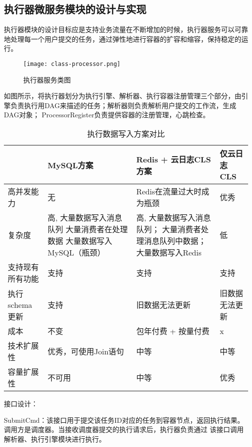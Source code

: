 \subsection{执行器微服务模块的设计与实现}

执行器模块的设计目标应是支持业务流量在不断增加的时候，执行器服务可以可靠地处理每一个用户提交的任务，通过弹性地进行容器的扩容和缩容，保持稳定的运行。

    \begin{figure}[H]
        \centering
        \texttt{[image: class-processor.png]}
        \caption{执行器服务类图}
        \label{fig:zxqfw}
    \end{figure}
    如图所示，将执行器划分为执行引擎、解析器、执行容器注册管理三个部分，由引擎负责执行用DAG来描述的任务；解析器则负责解析用户提交的工作流，生成DAG对象；
    ProcessorRegister负责提供容器的注册管理，心跳检查。


\begin{table}[H]
    \centering
    \caption{执行数据写入方案对比}
    \label{tab:design_1}
    \begin{tabular}{lp{8em}p{8em}l}
        \toprule
        & MySQL方案   & Redis + 云日志CLS方案          & 仅云日志CLS \\
        \midrule
        高并发能力 & 无 & Redis在流量过大时成为瓶颈 & 优秀\\
        复杂度 & 高, 大量数据写入消息队列
        大量消费者在处理数据
        大量数据写入MySQL（瓶颈）
        & 高, 大量数据写入消息队列；
        大量消费者处理消息队列中数据；
        大量数据写入Redis
        & 低\\
        支持现有所有功能 & 支持 & 支持 & 支持\\
        执行schema更新 & 支持 & 旧数据无法更新 & 旧数据无法更新\\
        成本 & 不变 & 包年付费 + 按量付费 & x\\
        技术扩展性 & 优秀，可使用Join语句 & 中等 & 中等\\
        容量扩展性 & 不可用 & 中等 & 优秀\\
        \bottomrule
    \end{tabular}
\end{table}

接口设计：

SubmitCmd：该接口用于提交该任务ID对应的任务到容器节点，返回执行结果。调用方是调度器。当接收调度器提交的执行请求后，执行器负责通过
该接口调用解析器、执行引擎模块进行执行。

